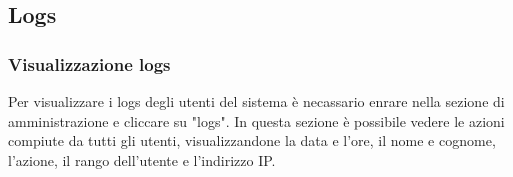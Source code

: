 \subsection{Logs}
	
	\subsubsection{Visualizzazione logs}
		Per visualizzare i logs degli utenti del sistema è necassario enrare nella sezione di amministrazione e cliccare su "logs". In questa sezione è possibile vedere le azioni compiute da tutti gli utenti, visualizzandone la data e l'ore, il nome e cognome, l'azione, il rango dell'utente e l'indirizzo IP.